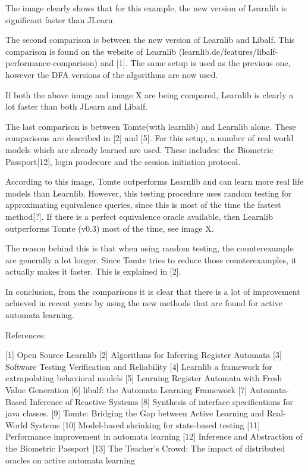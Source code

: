 \documentclass[multi,crop=false,class=article]{standalone}
\begin{document}


The image clearly shows that for this example, the new version of Learnlib is significant faster than JLearn.

The second comparison is between the new version of Learnlib and Libalf.
This comparison is found on the website of Learnlib (learnlib.de/features/libalf-performance-comparison) and [1].
The same setup is used as the previous one, however the DFA versions of the algorithms are now used.


If both the above image and image X are being compared, Learnlib is clearly a lot faster than both JLearn and Libalf.

The last comparison is between Tomte(with learnlib) and Learnlib alone. 
These comparisons are described in [2] and [5].
For this setup, a number of real world models which are already learned are used. These includes: the Biometric Passport[12], login prodecure and the session initiation protocol. 


According to this image, Tomte outperforms Learnlib and can learn more real life models than Learnlib. However, this testing 
procedure uses random testing for approximating equivalence queries, since this is most of the time the fastest method[?].
If there is a perfect equivalence oracle available, then Learnlib outperforms Tomte (v0.3) most of the time, see image X.


The reason behind this is that when using random testing, the counterexample are generally a lot longer. Since Tomte tries
to reduce those counterexamples, it actually makes it faster. This is explained in [2].



In conclusion, from the comparisons it is clear that there is a lot of improvement achieved in recent years by using 
the new methods that are found for active automata learning.



References:

[1] Open Source Learnlib
[2] Algorithms for Inferring Register Automata
[3] Software Testing Verification and Reliability
[4] Learnlib a framework for extrapolating behavioral models
[5] Learning Register Automata with Fresh Value Generation
[6] libalf: the Automata Learning Framework
[7] Automata-Based Inference of Reactive Systems
[8] Synthesis of interface specifications for java classes.
[9] Tomte: Bridging the Gap between Active Learning and Real-World Systems
[10] Model-based shrinking for state-based testing
[11] Performance improvement in automata learning
[12] Inference and Abstraction of the Biometric Passport
[13] The Teacher's Crowd: The impact of distributed oracles on active automata learning
\end{document}
